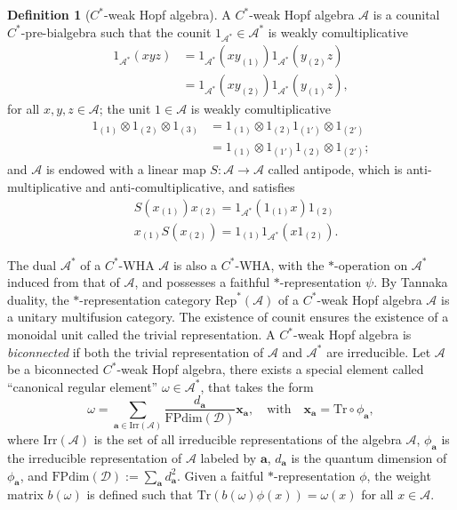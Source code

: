 \documentclass[prx, twocolumn, superscriptaddress, dvipsnames]{revtex4-2}
\theoremstyle{definition}
\newtheorem{defn}[thm]{Definition}
\newcommand{\ra}{\rightarrow}
\newcommand{\tr}{\mathrm{Tr}}
\newcommand{\mA}{\mathcal{A}}
\newcommand{\vbnt}{\mathbf{a}}
\newcommand{\cu}{1_{\mA^*}}
\def\XQ#1{{\color{XQ}#1}}
\begin{document}
\begin{defn}[$C^*$-weak Hopf algebra]
A $C^*$-weak Hopf algebra $\mA$ is a counital $C^*$-pre-bialgebra such that the counit $\cu\in \mA^*$ is weakly comultiplicative
\[
\begin{aligned}
 \cu(xyz)&=\cu(x y_{(1)})\cu(y_{(2)}z)\\
 &=\cu(x y_{(2)}) \cu(y_{(1)} z),   
\end{aligned}
\]
for all $x,y,z\in\mA$; the unit $1\in\mA$ is weakly comultiplicative
\[
\begin{aligned}
1_{(1)}\otimes 1_{(2)}\otimes 1_{(3)}&=1_{(1)}\otimes 1_{(2)} 1_{(1')}\otimes 1_{(2')}\\
&=1_{(1)}\otimes 1_{(1')} 1_{(2)} \otimes 1_{(2')};    
\end{aligned}
\]
and $\mA$ is endowed with a linear map $S:\mA\ra\mA$  called antipode, which is anti-multiplicative and anti-comultiplicative, and satisfies
\[
\begin{aligned}
    & S(x_{(1)}) x_{(2)}=\cu(1_{(1)}x)1_{(2)}\\
    &x_{(1)}S(x_{(2)})=1_{(1)}\cu(x 1_{(2)}).
\end{aligned}
\]
\end{defn}

The dual $\mA^*$ of a $C^*$-WHA $\mA$ is also a $C^*$-WHA, with the $*$-operation on $\mA^*$ induced from that of $\mA$, and possesses a faithful $*$-representation $\psi$. 
By Tannaka duality, the $*$-representation category $\text{Rep}^*(\mA)$ of a $C^*$-weak Hopf algebra $\mA$ is a unitary multifusion category. 
The existence of counit ensures the existence of a monoidal unit called the trivial representation. A $C^*$-weak Hopf algebra is \textit{biconnected} if both the trivial representation of $\mA$ and $\mA^*$ are irreducible. Let $\mA$ be a biconnected $C^*$-weak Hopf algebra, there exists a special element called ``canonical regular element'' $\omega\in\mA^*$, that takes the form
\begin{equation}
    \omega=\sum_{\vbnt\in\text{Irr}(\mA)} \frac{d_\vbnt}{\mathrm{FPdim}(\mathcal D)} \textbf{x}_\vbnt,\quad \text{with} \quad\textbf{x}_\vbnt=\tr\circ \phi_\vbnt,
\end{equation}
where $\text{Irr}(\mA)$ is the set of all irreducible representations of the algebra $\mA$, $\phi_\vbnt$ is the irreducible representation of $\mA$ labeled by $\vbnt$, $d_\vbnt$ is the quantum dimension of $\phi_\vbnt$, and $\mathrm{FPdim}(\mathcal D):=\sum_\vbnt d_\vbnt^2$. Given a faitful $*$-representation $\phi$, the weight matrix $b(\omega)$ is defined such that $\tr(b(\omega)\phi(x))=\omega(x)$ for all $x\in\mA$. 
\end{document}
